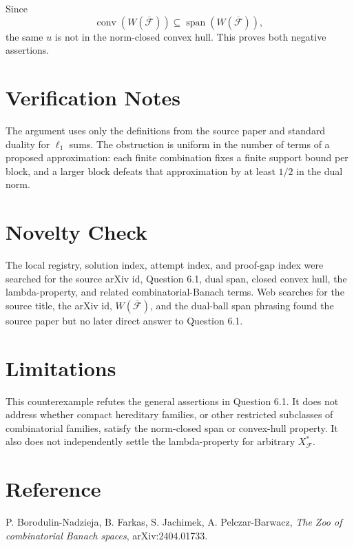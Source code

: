 \documentclass[11pt]{article}
\begin{document}
Since
\[
  \operatorname{conv}(W(\overline{\mathcal F}))
  \subseteq
  \operatorname{span}(W(\overline{\mathcal F})),
\]
the same $u$ is not in the norm-closed convex hull.  This proves both negative
assertions.

\section*{Verification Notes}

The argument uses only the definitions from the source paper and standard
duality for $\ell_1$ sums.  The obstruction is uniform in the number of terms
of a proposed approximation: each finite combination fixes a finite support
bound per block, and a larger block defeats that approximation by at least
$1/2$ in the dual norm.

\section*{Novelty Check}

The local registry, solution index, attempt index, and proof-gap index were
searched for the source arXiv id, Question 6.1, dual span, closed convex hull,
the lambda-property, and related combinatorial-Banach terms.  Web searches
for the source title, the arXiv id, $W(\overline{\mathcal F})$, and the
dual-ball span phrasing found the source paper but no later direct answer to
Question 6.1.

\section*{Limitations}

This counterexample refutes the general assertions in Question 6.1.  It does
not address whether compact hereditary families, or other restricted subclasses
of combinatorial families, satisfy the norm-closed span or convex-hull
property.  It also does not independently settle the lambda-property for
arbitrary $X_{\mathcal F}^*$.

\section*{Reference}

P. Borodulin-Nadzieja, B. Farkas, S. Jachimek, A. Pelczar-Barwacz,
\emph{The Zoo of combinatorial Banach spaces}, arXiv:2404.01733.
\end{document}
